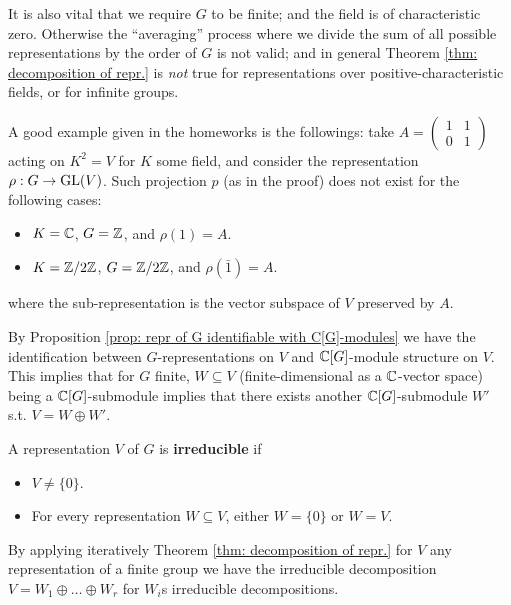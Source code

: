\documentclass{article}
\begin{document}
\begin{remark}\label{rmk: counterexample for nonzero char. field or infintie group}
    It is also vital that we require $G$ to be finite; and the field is of characteristic zero. Otherwise the ``averaging'' process where we divide the sum of all possible representations by the order of $G$ is not valid; and in general Theorem \ref{thm: decomposition of repr.} is \emph{not} true for representations over positive-characteristic fields, or for infinite groups.
    
    A good example given in the homeworks is the followings: take $A = \begin{pmatrix} 1 & 1 \\ 0 & 1 \end{pmatrix}$ acting on $K^2 = V$ for $K$ some field, and consider the representation $\rho: G \to \mathrm{GL}(V)$. Such projection $p$ (as in the proof) does not exist for the following cases:
    \begin{itemize}
        \item $K = \mathbb{C}$, $G = \mathbb{Z}$, and $\rho(1) = A$.
        \item $K = \mathbb{Z}/2\mathbb{Z}$, $G = \mathbb{Z}/2\mathbb{Z}$, and $\rho(\bar{1}) = A$.
    \end{itemize}
    where the sub-representation is the vector subspace of $V$ preserved by $A$. 
\end{remark}

\begin{remark}
    By Proposition \ref{prop: repr of G identifiable with C[G]-modules} we have the identification between $G$-representations on $V$ and $\mathbb{C}[G]$-module structure on $V$. This implies that for $G$ finite, $W \subseteq V$ (finite-dimensional as a $\mathbb{C}$-vector space) being a $\mathbb{C}[G]$-submodule implies that there exists another $\mathbb{C}[G]$-submodule $W'$ s.t. $V = W \oplus W'$.
\end{remark}

\begin{definition}[Irreducible]
    A representation $V$ of $G$ is \textbf{irreducible} if
    \begin{itemize}
        \item $V \neq \{0\}$.
        \item For every representation $W \subseteq V$, either $W = \{0\}$ or $W = V$.
    \end{itemize}
\end{definition}

\begin{corollary}
    By applying iteratively Theorem \ref{thm: decomposition of repr.} for $V$ any representation of a finite group we have the irreducible decomposition $V = W_1 \oplus \dots \oplus W_r$ for $W_i$s irreducible decompositions.
\end{corollary}
\end{document}
